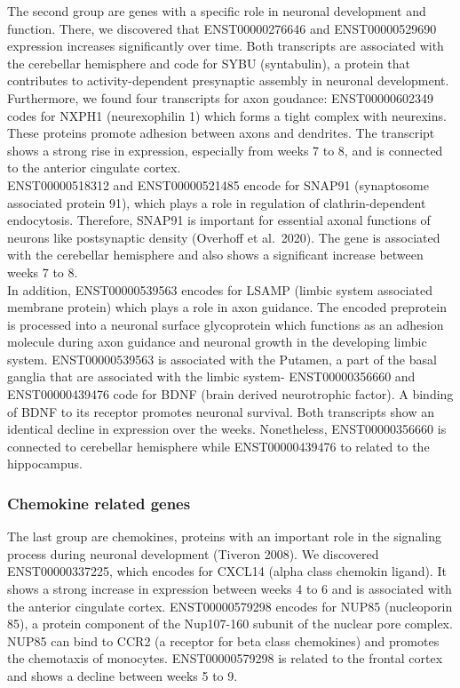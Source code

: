 \documentclass[
]{article}
\begin{document}
The second group are genes with a specific role in neuronal development and function. There, we discovered that ENST00000276646 and ENST00000529690 expression increases significantly over time. Both transcripts are associated with the cerebellar hemisphere and code for SYBU (syntabulin), a protein that contributes to activity-dependent presynaptic assembly in neuronal development.\\
Furthermore, we found four transcripts for axon goudance: ENST00000602349 codes for NXPH1 (neurexophilin 1) which forms a tight complex with neurexins. These proteins promote adhesion between axons and dendrites. The transcript shows a strong rise in expression, especially from weeks 7 to 8, and is connected to the anterior cingulate cortex.\\
ENST00000518312 and ENST00000521485 encode for SNAP91 (synaptosome associated protein 91), which plays a role in regulation of clathrin-dependent endocytosis. Therefore, SNAP91 is important for essential axonal functions of neurons like postsynaptic density (Overhoff et al.~2020). The gene is associated with the cerebellar hemisphere and also shows a significant increase between weeks 7 to 8.\\
In addition, ENST00000539563 encodes for LSAMP (limbic system associated membrane protein) which plays a role in axon guidance. The encoded preprotein is processed into a neuronal surface glycoprotein which functions as an adhesion molecule during axon guidance and neuronal growth in the developing limbic system. ENST00000539563 is associated with the Putamen, a part of the basal ganglia that are associated with the limbic system-
ENST00000356660 and ENST00000439476 code for BDNF (brain derived neurotrophic factor). A binding of BDNF to its receptor promotes neuronal survival. Both transcripts show an identical decline in expression over the weeks. Nonetheless, ENST00000356660 is connected to cerebellar hemisphere while ENST00000439476 to related to the hippocampus.

\hypertarget{chemokine-related-genes}{%
\subsubsection{Chemokine related genes}\label{chemokine-related-genes}}

The last group are chemokines, proteins with an important role in the signaling process during neuronal development (Tiveron 2008). We discovered ENST00000337225, which encodes for CXCL14 (alpha class chemokin ligand). It shows a strong increase in expression between weeks 4 to 6 and is associated with the anterior cingulate cortex. ENST00000579298 encodes for NUP85 (nucleoporin 85), a protein component of the Nup107-160 subunit of the nuclear pore complex. NUP85 can bind to CCR2 (a receptor for beta class chemokines) and promotes the chemotaxis of monocytes. ENST00000579298 is related to the frontal cortex and shows a decline between weeks 5 to 9.
\end{document}

